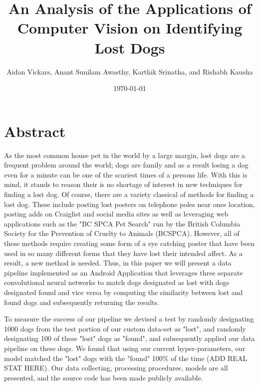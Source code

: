\documentclass{article}
\title{An Analysis of the Applications of Computer Vision on Identifying Lost Dogs}
\author{Aidan Vickars, Anant Sunilam Awasthy, Karthik Srinatha, and Rishabh Kausha}
\date{\today}
\begin{document}
\maketitle

\newpage
\section{Abstract}
As the most common house pet in the world by a large margin, lost dogs are a frequent problem around the world; dogs are family and as a result losing a dog even for a minute can be one of the scariest times of a persons life.  With this is mind, it stands to reason their is no shortage of interest in new techniques for finding a lost dog.  Of course, there are a variety classical of methods for finding a lost dog.  These include posting lost posters on telephone poles near ones location, posting adds on Craiglist and social media sites as well as leveraging web applications such as the "BC SPCA Pet Search" run by the British Columbia Society for the Prevention of Cruelty to Animals (BCSPCA).  However, all of these methods require creating some form of a eye catching poster that have been used in so many different forms that they have lost their intended affect.  As a result, a new method is needed.  Thus, in this paper we will present a data pipeline implemented as an Android Application that leverages three separate convolutional neural networks to match dogs designated as lost with dogs designated found and vice versa by computing the similarity between lost and found dogs and subsequently returning the results.

To measure the success of our pipeline we devised a test by randomly designating 1000 dogs from the test portion of our custom data-set as "lost", and randomly designating 100 of these "lost" dogs as "found", and subsequently applied our data pipeline on these dogs.  We found that using our current hyper-parameters, our model matched the "lost" dogs with the "found" 100\% of the time (ADD REAL STAT HERE).  Our data collecting, processing procedures, models are all presented, and the source code has been made publicly available.
\end{document}
